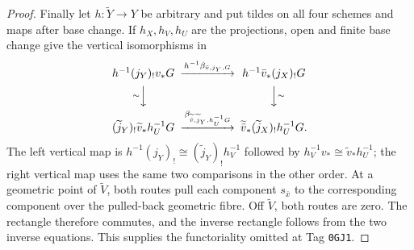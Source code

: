 \begin{proof}
Finally let $h:\widetilde Y\to Y$ be arbitrary and put tildes on all four
schemes and maps after base change.  If $h_X,h_V,h_U$ are the projections,
open and finite base change give the vertical isomorphisms in
\[
\begin{CD}
 h^{-1}(j_Y)_!v_*G
 @>{h^{-1}\beta_{\bar v,j_Y,G}}>>
 h^{-1}\bar v_*(j_X)_!G\\
 @V{\sim}VV @VV{\sim}V\\
 (\widetilde j_Y)_!\widetilde v_*h_U^{-1}G
 @>{\beta_{\widetilde{\bar v},\widetilde j_Y,h_U^{-1}G}}>>
 \widetilde{\bar v}_*(\widetilde j_X)_!h_U^{-1}G .
\end{CD}
\]
The left vertical map is
$h^{-1}(j_Y)_!\cong(\widetilde j_Y)_!h_V^{-1}$ followed by
$h_V^{-1}v_*\cong\widetilde v_*h_U^{-1}$; the right vertical map uses the
same two comparisons in the other order.  At a geometric point of
$\widetilde V$, both routes pull each component $s_{\bar x}$ to the
corresponding component over the pulled-back geometric fibre.  Off
$\widetilde V$, both routes are zero.  The rectangle therefore commutes,
and the inverse rectangle follows from the two inverse equations.  This
supplies the functoriality omitted at Tag \texttt{0GJ1}.
\end{proof}

